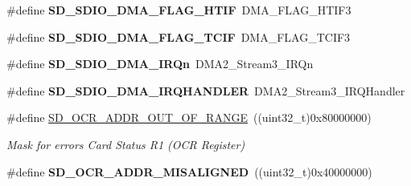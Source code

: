 \begin{DoxyCompactItemize}
\item 
\#define {\bfseries S\+D\+\_\+\+S\+D\+I\+O\+\_\+\+D\+M\+A\+\_\+\+F\+L\+A\+G\+\_\+\+H\+T\+IF}~D\+M\+A\+\_\+\+F\+L\+A\+G\+\_\+\+H\+T\+I\+F3\hypertarget{group___s_t_m324x_g___e_v_a_l___s_d_i_o___s_d___private___defines_ga0ce367af65ca9d6740bcc2b8345f0a31}{}\label{group___s_t_m324x_g___e_v_a_l___s_d_i_o___s_d___private___defines_ga0ce367af65ca9d6740bcc2b8345f0a31}

\item 
\#define {\bfseries S\+D\+\_\+\+S\+D\+I\+O\+\_\+\+D\+M\+A\+\_\+\+F\+L\+A\+G\+\_\+\+T\+C\+IF}~D\+M\+A\+\_\+\+F\+L\+A\+G\+\_\+\+T\+C\+I\+F3\hypertarget{group___s_t_m324x_g___e_v_a_l___s_d_i_o___s_d___private___defines_ga5e166e41de170efcc2d85edff3ddbee1}{}\label{group___s_t_m324x_g___e_v_a_l___s_d_i_o___s_d___private___defines_ga5e166e41de170efcc2d85edff3ddbee1}

\item 
\#define {\bfseries S\+D\+\_\+\+S\+D\+I\+O\+\_\+\+D\+M\+A\+\_\+\+I\+R\+Qn}~D\+M\+A2\+\_\+\+Stream3\+\_\+\+I\+R\+Qn\hypertarget{group___s_t_m324x_g___e_v_a_l___s_d_i_o___s_d___private___defines_gad126831b065276eed5e2e2260446fc2f}{}\label{group___s_t_m324x_g___e_v_a_l___s_d_i_o___s_d___private___defines_gad126831b065276eed5e2e2260446fc2f}

\item 
\#define {\bfseries S\+D\+\_\+\+S\+D\+I\+O\+\_\+\+D\+M\+A\+\_\+\+I\+R\+Q\+H\+A\+N\+D\+L\+ER}~D\+M\+A2\+\_\+\+Stream3\+\_\+\+I\+R\+Q\+Handler\hypertarget{group___s_t_m324x_g___e_v_a_l___s_d_i_o___s_d___private___defines_ga0d033e4a3e615dcdfc30596e347ad3ea}{}\label{group___s_t_m324x_g___e_v_a_l___s_d_i_o___s_d___private___defines_ga0d033e4a3e615dcdfc30596e347ad3ea}

\item 
\#define \hyperlink{group___s_t_m324x_g___e_v_a_l___s_d_i_o___s_d___private___defines_ga69314e11291e427652a4f6a3a5b1c439}{S\+D\+\_\+\+O\+C\+R\+\_\+\+A\+D\+D\+R\+\_\+\+O\+U\+T\+\_\+\+O\+F\+\_\+\+R\+A\+N\+GE}~((uint32\+\_\+t)0x80000000)\hypertarget{group___s_t_m324x_g___e_v_a_l___s_d_i_o___s_d___private___defines_ga69314e11291e427652a4f6a3a5b1c439}{}\label{group___s_t_m324x_g___e_v_a_l___s_d_i_o___s_d___private___defines_ga69314e11291e427652a4f6a3a5b1c439}

\begin{DoxyCompactList}\small\item\em Mask for errors Card Status R1 (O\+CR Register) \end{DoxyCompactList}\item 
\#define {\bfseries S\+D\+\_\+\+O\+C\+R\+\_\+\+A\+D\+D\+R\+\_\+\+M\+I\+S\+A\+L\+I\+G\+N\+ED}~((uint32\+\_\+t)0x40000000)\hypertarget{group___s_t_m324x_g___e_v_a_l___s_d_i_o___s_d___private___defines_ga540633bf8f3289c628063e2c1bd5f9ab}{}\label{group___s_t_m324x_g___e_v_a_l___s_d_i_o___s_d___private___defines_ga540633bf8f3289c628063e2c1bd5f9ab}


\end{DoxyCompactItemize}
